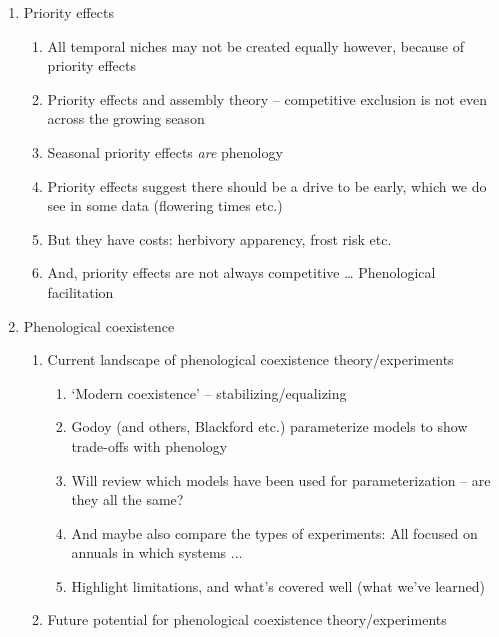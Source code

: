 \documentclass[11pt]{article}
\begin{document}
\begin{enumerate}
\begin{enumerate}
\end{enumerate}
\item Priority effects %
\begin{enumerate}
\item All temporal niches may not be created equally however, because of priority effects 
\item Priority effects and assembly theory – competitive exclusion is not even across the growing season %
\item Seasonal priority effects \emph{are} phenology \citep{connolly1999,fukami2015} %
\item Priority effects suggest there should be a drive to be early, which we do see in some data (flowering times etc.) %
\item But they have costs: herbivory apparency, frost risk etc. 
\item And, priority effects are not always competitive … Phenological facilitation \cite{leverett2017}
\end{enumerate}
\item Phenological coexistence
\begin{enumerate}
\item Current landscape of phenological coexistence theory/experiments
\begin{enumerate}
\item `Modern coexistence' -- stabilizing/equalizing 
\item Godoy (and others, Blackford etc.) parameterize models to show trade-offs with phenology %
\item Will review which models have been used for parameterization -- are they all the same?
\item And maybe also compare the types of experiments: All focused on annuals in  which systems ...
\item Highlight limitations, and what's covered well (what we've learned) %
\end{enumerate}
\item Future potential for phenological coexistence theory/experiments

\end{enumerate}
\end{enumerate}
\end{document}
